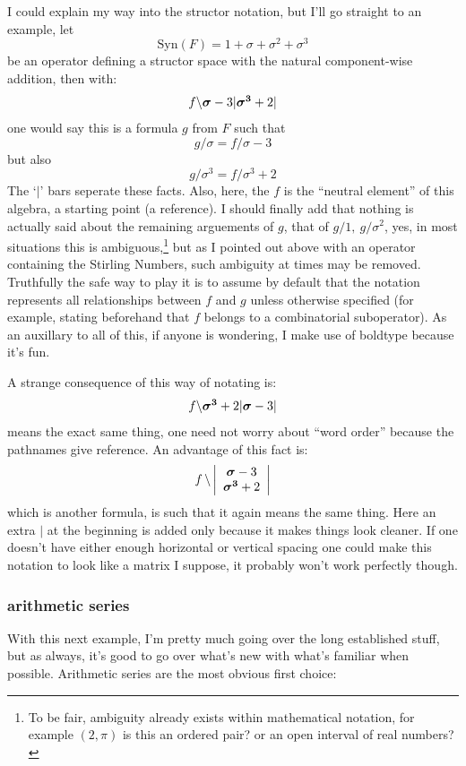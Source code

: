 \documentclass[twoside]{article}
\begin{document}
I could explain my way into the structor notation, but I'll go straight to an example, let
$$ \mbox{Syn}(F)=1+\sigma+\sigma^2+\sigma^3 $$
be an operator defining a structor space with the natural component-wise addition, then with:
$$ f\backslash\mbox{\boldmath $ \sigma $} -3 |\mbox{\boldmath $ \sigma^{3} $} +2| $$
one would say this is a formula $ g $ from $ F $ such that
$$ g/\sigma=f/\sigma-3 $$
but also 
$$ g/\sigma^3=f/\sigma^3+2 $$
The `$ | $' bars seperate these facts.  Also, here, the $ f $ is the ``neutral element'' of this algebra, a starting
point (a reference).  I should finally add that nothing is actually said about the remaining arguements of $ g $, that
of $ g/1,\ g/\sigma^2 $, yes, in most situations this is ambiguous,\footnote{To be fair, ambiguity already exists
within mathematical notation, for example $ (2, \pi) $ is this an ordered pair? or an open interval of real numbers?}
but as I pointed out above with an operator containing the Stirling Numbers, such ambiguity at times may be removed.
Truthfully the safe way to play it is to assume by default that the notation represents all relationships between
$ f $ and $ g $ unless otherwise specified (for example, stating beforehand that $ f $ belongs to a combinatorial
suboperator).  As an auxillary to all of this, if anyone is wondering, I make use of boldtype because it's fun.

A strange consequence of this way of notating is:
$$ f\backslash\mbox{\boldmath $ \sigma^{3} $} +2|\mbox{\boldmath $ \sigma $} -3 | $$
means the exact same thing, one need not worry about ``word order'' because the pathnames give reference.  An advantage
of this fact is:
$$ f\,\backslash\left|
\begin{array}{c}
\mbox{\boldmath $ \sigma $} -3 \\
\mbox{\boldmath $ \sigma^{3} $} +2
\end{array}\right| $$
which is another formula, is such that it again means the same thing.  Here an extra $ | $ at the beginning is added
only because it makes things look cleaner.  If one doesn't have either enough horizontal or vertical spacing one could
make this notation to look like a matrix I suppose, it probably won't work perfectly though.

\subsubsection{arithmetic series}

With this next example, I'm pretty much going over the long established stuff, but as always, it's good to go over
what's new with what's familiar when possible.  Arithmetic series are the most obvious first choice:
\end{document}
